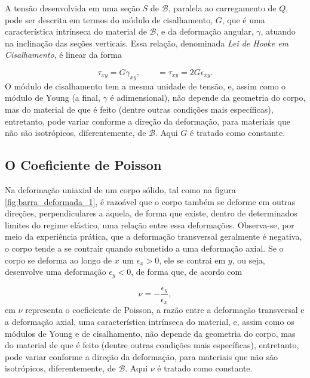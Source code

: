A tensão desenvolvida em uma seção $S$ de $\mathcal{B}$, paralela ao carregamento de  $Q$, pode ser descrita em termos do módulo de cisalhamento, $G$, que é uma característica intrínseca do material de $\mathcal{B}$, e da deformação angular, $\gamma$, atuando na inclinação das seções verticais. Essa relação, denominada \emph{Lei de Hooke em Cisalhamento}, é linear da forma

\begin{equation}
    \tau_{xy} = G \gamma_{xy}, \qquad = \tau_{xy} = 2G \epsilon_{xy}.
    \label{eq:lei_de_hooke_cisalhamento}
\end{equation}
O módulo de cisalhamento tem a mesma unidade de tensão, e, assim como o módulo de Young (a final, $\gamma$ é adimensional), não depende da geometria do corpo, mas do material de que é feito (dentre outras condições mais específicas), entretanto, pode variar conforme a direção da deformação, para materiais que não são isotrópicos, diferentemente, de $\mathcal{B}$. Aqui $G$ é tratado como constante.

\subsection{O Coeficiente de Poisson}

Na deformação uniaxial de um corpo sólido, tal como na figura \ref{fig:barra_deformada_1}, é razoável que o corpo também se deforme em outras direções, perpendiculares a aquela, de forma que existe, dentro de determinados limites do regime elástico, uma relação entre essa deformações. Observa-se, por meio da experiência prática, que a deformação transversal geralmente é negativa, o corpo tende a se contrair quando submetido a uma deformação axial. Se o corpo se deforma ao longo de $x$ um $\epsilon_x > 0$, ele se contrai em $y$, ou seja, desenvolve uma deformação $\epsilon_y < 0$, de forma que, de acordo com 

\begin{equation}
    \nu = -\frac{\epsilon_y}{\epsilon_x},
    \label{eq:coeficiente_de_poisson}
\end{equation}
em $\nu$ representa o coeficiente de Poisson, a razão entre a deformação transversal e a deformação axial, uma característica intrínseca do material, e, assim como os módulos de Young e de cisalhamento, não depende da geometria do corpo, mas do material de que é feito (dentre outras condições mais específicas), entretanto, pode variar conforme a direção da deformação, para materiais que não são isotrópicos, diferentemente, de $\mathcal{B}$. Aqui $\nu$ é tratado como constante.

